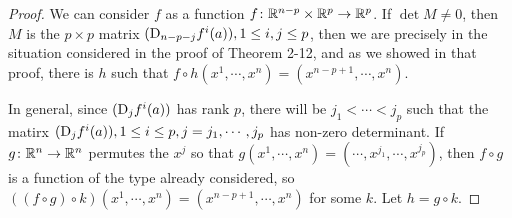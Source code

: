 \begin{proof}
    We can consider $f$ as a function $f\colon{}\mathbb{R}^{n-p}\times \mathbb{R}^p\to \mathbb{R}^p$.
    If $\det M\neq 0$, then $M$ is the $p\times p$ matrix $(\mathrm{D}_{n-p-j}f^i(a)), 1\le i,j\le p$,
    then we are precisely in the situation considered in the proof of Theorem 2-12, and as we 
    showed in that proof, there is $h$ such that $f\circ h(x^1, \cdots, x^n) = (x^{n-p+1}, \cdots, x^n)$.
    
    In general, since $(\mathrm{D}_jf^i(a))$ has rank $p$, there will be $j_1<\cdots<j_p$ such that the
    matirx $(\mathrm{D}_jf^i(a)), 1\le i\le p, j=j_1, \cdots, j_p$ has non-zero determinant. If $g\colon{}\mathbb{R}^n\to \mathbb{R}^n$ 
    permutes the $x^j$ so that $g(x^1, \cdots, x^n) = (\cdots, x^{j_1}, \cdots, x^{j_p})$, then 
    $f\circ g$ is a function of the type already considered, so $((f\circ g)\circ k)(x^1,\cdots, x^n) = (x^{n-p+1}, \cdots, x^n)$ 
    for some $k$.  Let $h=g\circ k$.  
\end{proof}

\begin{problems}
\end{problems}